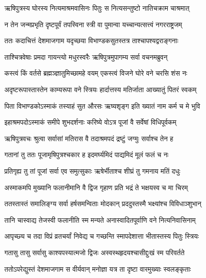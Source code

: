 \twolineshloka
{ऋषिपुत्रस्य घोरस्य नित्यमाश्रमवासिनः}
{पितुः स नित्यसन्तुष्टो नातिचक्राम चाश्रमात्} %

\twolineshloka
{न तेन जन्मप्रभृति दृष्टपूर्वं तपस्विना}
{स्त्री वा पुमान्वा यच्चान्यत्सत्त्वं नगरराष्ट्रजम्} %

\twolineshloka
{ततः कदाचित्तं देशमाजगाम यदृच्छया}
{विभाण्डकसुतस्तत्र ताश्चापश्यद्वराङ्गनाः} %

\twolineshloka
{ताश्चित्रवेषाः प्रमदा गायन्त्यो मधुरस्वरैः}
{ऋषिपुत्रमुपागम्य सर्वा वचनमब्रुवन्} %

\twolineshloka
{कस्त्वं किं वर्तसे ब्रह्मञ्ज्ञातुमिच्छामहे वयम्}
{एकस्त्वं विजने घोरे वने चरसि शंस नः} %

\twolineshloka
{अदृष्टरूपास्तास्तेन काम्यरूपा वने स्त्रियः}
{हार्दात्तस्य मतिर्जाता आख्यातुं पितरं स्वकम्} %

\twolineshloka
{पिता विभाण्डकोऽस्माकं तस्याहं सुत औरसः}
{ऋष्यशृङ्ग इति ख्यातं नाम कर्म च मे भुवि} %

\twolineshloka
{इहाश्रमपदोऽस्माकं समीपे शुभदर्शनाः}
{करिष्ये वोऽत्र पूजां वै सर्वेषां विधिपूर्वकम्} %

\twolineshloka
{ऋषिपुत्रवचः श्रुत्वा सर्वासां मतिरास वै}
{तदाश्रमपदं द्रष्टुं जग्मुः सर्वाश्च तेन ह} %

\twolineshloka
{गतानां तु ततः पूजामृषिपुत्रश्चकार ह}
{इदमर्घ्यमिदं पाद्यमिदं मूलं फलं च नः} %

\twolineshloka
{प्रतिगृह्य तु तां पूजां सर्वा एव समुत्सुकाः}
{ऋषेर्भीताश्च शीघ्रं तु गमनाय मतिं दधुः} %

\twolineshloka
{अस्माकमपि मुख्यानि फलानीमानि वै द्विज}
{गृहाण प्रति भद्रं ते भक्षयस्व च मा चिरम्} %

\twolineshloka
{ततस्तास्तं समालिङ्ग्य सर्वा हर्षसमन्विताः}
{मोदकान् प्रददुस्तस्मै भक्ष्यांश्च विविधाञ्शुभान्} %

\twolineshloka
{तानि चास्वाद्य तेजस्वी फलानीति स्म मन्यते}
{अनास्वादितपूर्वाणि वने नित्यनिवासिनाम्} %

\twolineshloka
{आपृच्छ्य च तदा विप्रं व्रतचर्यां निवेद्य च}
{गच्छन्ति स्मापदेशात्ता भीतास्तस्य पितुः स्त्रियः} %

\twolineshloka
{गतासु तासु सर्वासु काश्यपस्यात्मजो द्विजः}
{अस्वस्थहृदयश्चासीद्दुःखं स्म परिवर्तते} %

\twolineshloka
{ततोऽपरेद्युस्तं देशमाजगाम स वीर्यवान्}
{मनोज्ञा यत्र ता दृष्टा वारमुख्याः स्वलङ्कृताः} %

